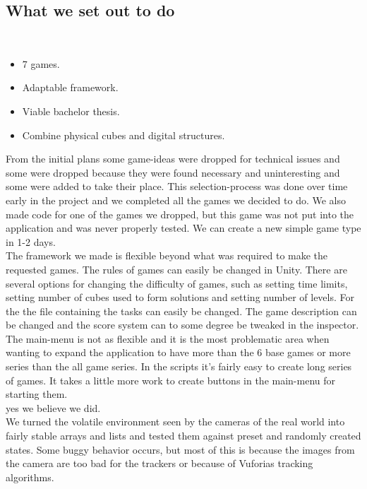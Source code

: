 \subsection{What we set out to do}

\begin{description}
	\item {}

	\item[Result goals]\ 
	\begin{itemize}
		\item 7 games.
		\item Adaptable framework.
		\item Viable bachelor thesis.
		\item Combine physical cubes and digital structures.
	\end{itemize}
	From the initial plans some game-ideas were dropped for technical issues and some were dropped because they were found necessary and uninteresting and some were added to take their place. 
	This selection-process was done over time early in the project and we completed all the games we decided to do. 
	We also made code for one of the games we dropped, but this game was not put into the application and was never properly tested. 
	We can create a new simple game type in 1-2 days.\\
	The framework we made is flexible beyond what was required to make the requested games. 
	The rules of games can easily be changed in Unity. 
	There are several options for changing the difficulty of games, such as setting time limits, setting number of cubes used to form solutions and setting number of levels. 
	For the \nameref{game:wo0ord_game} the file containing the tasks can easily be changed. 
	The game description can be changed and the score system can to some degree be tweaked in the inspector. 
	The main-menu is not as flexible and it is the most problematic area when wanting to expand the application to have more than the 6 base games or more series than the all game series. 
	In the scripts it's fairly easy to create long series of games. It takes a little more work to create buttons in the main-menu for starting them.\\
	\todo{did we do enough work?}
	yes we believe we did.\\
	We turned the volatile environment seen by the cameras of the real world into fairly stable arrays and lists and tested them against preset and randomly created states. 
	Some buggy behavior occurs, but most of this is because the images from the camera are too bad for the trackers or because of Vuforias tracking algorithms.\\


\end{description}
